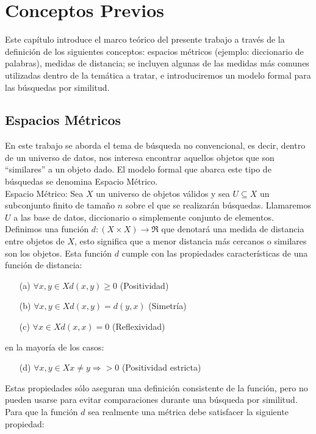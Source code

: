 \chapter{Conceptos Previos}

Este cap\'itulo introduce el marco te\'orico del presente trabajo a trav\'es de 
la definici\'on de los siguientes conceptos: espacios m\'etricos (ejemplo: diccionario de 
palabras), medidas de distancia; se incluyen algunas de las medidas m\'as comunes utilizadas 
dentro de la tem\'atica a tratar, e introduciremos un modelo formal para las b\'usquedas por 
similitud.\\

\section{Espacios M\'etricos}

En este trabajo se aborda el tema de b\'usqueda no convencional, es decir, dentro de un universo 
de datos, nos interesa encontrar aquellos objetos que son ``similares'' a un objeto dado. El modelo 
formal que abarca este tipo de b\'usquedas se denomina Espacio M\'etrico.\\

Espacio M\'etrico:
Sea $X$ un universo de objetos v\'alidos y sea $U \subseteq X$ un subconjunto finito de tama\~no $n$ 
sobre el que se realizar\'an b\'usquedas. Llamaremos $U$ a las base de datos, diccionario o 
simplemente conjunto de elementos.
Definimos una funci\'on $d:(X \times X) \rightarrow \Re$ que denotar\'a una medida de distancia 
entre objetos de $X$, esto significa que a menor distancia m\'as cercanos o similares son los 
objetos. Esta funci\'on $d$ cumple con las propiedades caracter\'isticas de una funci\'on de 
distancia:

\begin{enumerate}
\item [(a)] $\forall x,y \in X d(x,y) \geq 0$ (Positividad)
\item [(b)] $\forall x,y \in X d(x,y) = d(y,x)$ (Simetr\'ia)
\item [(c)] $\forall x \in X d(x,x) = 0 $ (Reflexividad)
\end{enumerate}
en la mayor\'ia de los casos:
\begin{enumerate}
\item [(d)]  $\forall x,y \in X x \neq y \Rightarrow > 0$ (Positividad estricta)
\end{enumerate}


Estas propiedades s\'olo aseguran una definici\'on consistente de la funci\'on, pero no pueden 
usarse para evitar comparaciones durante una b\'usqueda por similitud. Para que la funci\'on $d$ sea 
realmente una m\'etrica debe satisfacer la siguiente propiedad:

